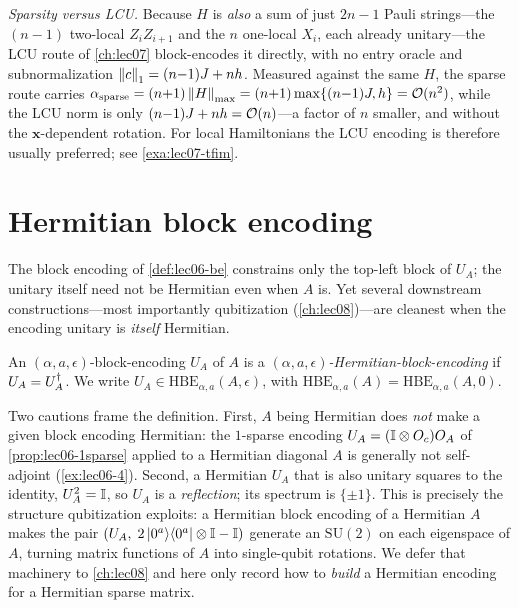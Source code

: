 \begin{example}
\emph{Sparsity versus LCU.} Because $H$ is \emph{also} a sum of just $2n{-}1$ Pauli
strings---the $(n{-}1)$ two-local $Z_iZ_{i+1}$ and the $n$ one-local $X_i$, each already
unitary---the LCU route of \cref{ch:lec07} block-encodes it directly, with no entry oracle
and subnormalization $\left\lVert c \right\rVert_1=(n{-}1)J+nh$. Measured against the same $H$, the sparse route
carries $\alpha_{\text{sparse}}=(n{+}1)\left\lVert H \right\rVert_{\max}=(n{+}1)\max\{(n{-}1)J,h\}=\mathcal{O}(n^2)$,
while the LCU norm is only $(n{-}1)J+nh=\mathcal{O}(n)$---a factor of $n$ smaller, and without the
$\mathbf x$-dependent rotation. For local Hamiltonians the LCU encoding is therefore usually
preferred; see \cref{exa:lec07-tfim}.
\end{example}

\section{Hermitian block encoding}
\label{sec:lec06-4}

The block encoding of \cref{def:lec06-be} constrains only the top-left block of
$U_A$; the unitary itself need not be Hermitian even when $A$ is. Yet several
downstream constructions---most importantly qubitization (\cref{ch:lec08})---are
cleanest when the encoding unitary is \emph{itself} Hermitian.

\begin{definition}
\label{def:lec06-hbe}
An $(\alpha,a,\epsilon)$-block-encoding $U_A$ of $A$ is a
\emph{$(\alpha,a,\epsilon)$-Hermitian-block-encoding} if $U_A=U_A^{\dagger}$. We write
$U_A\in\mathrm{HBE}_{\alpha,a}(A,\epsilon)$, with
$\mathrm{HBE}_{\alpha,a}(A)=\mathrm{HBE}_{\alpha,a}(A,0)$.
\end{definition}

Two cautions frame the definition. First, $A$ being Hermitian does \emph{not} make a
given block encoding Hermitian: the $1$-sparse encoding $U_A=(\mathbb{I}\otimes O_c)O_A$ of
\cref{prop:lec06-1sparse} applied to a Hermitian diagonal $A$ is generally not
self-adjoint (\cref{ex:lec06-4}). Second, a Hermitian $U_A$ that is also unitary
squares to the identity, $U_A^2=\mathbb{I}$, so $U_A$ is a \emph{reflection}; its spectrum
is $\{\pm1\}$. This is precisely the structure qubitization exploits: a Hermitian
block encoding of a Hermitian $A$ makes the pair
$(U_A,\;2\ket{0^a}\!\bra{0^a}\otimes\mathbb{I}-\mathbb{I})$ generate an $\mathrm{SU}(2)$ on each eigenspace of
$A$, turning matrix functions of $A$ into single-qubit rotations. We defer that
machinery to \cref{ch:lec08} and here only record how to \emph{build} a Hermitian
encoding for a Hermitian sparse matrix.

